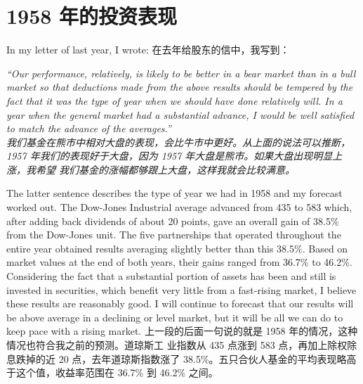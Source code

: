 \section{1958 年的投资表现}

\begin{verseparallel}
  {
    In my letter of last year, I wrote:
  }
  {
    在去年给股东的信中，我写到：\\
  }
\end{verseparallel}

\begin{verseparallel}
    { 
      \hspace{-0.9em}
      \textit{
      “Our performance, relatively, is likely to be better in a bear market
      than in a bull market so that deductions made from the above results
      should be tempered by the fact that it was the type of year when we should
      have done relatively will. In a year when the general market had a
      substantial advance, I would be well satisfied to match the advance of the
      averages.” \\
      }
    }
    {
      \hspace{-0.6em}
      \textit{
      我们基金在熊市中相对大盘的表现，会比牛市中更好。从上面的说法可以推断，1957
      年我们的表现好于大盘，因为 1957 年大盘是熊市。如果大盘出现明显上涨，我希望
      我们基金的涨幅都够跟上大盘，这样我就会比较满意。
      }
    }
\end{verseparallel}

\begin{verseparallel}
  {
    The latter sentence describes the type of year we had in 1958 and my
    forecast worked out. The Dow-Jones Industrial average advanced from 435 to
    583 which, after adding back dividends of about 20 points, gave an overall
    gain of 38.5\% from the Dow-Jones unit. The five partnerships that operated
    throughout the entire year obtained results averaging slightly better than
    this 38.5\%. Based on market values at the end of both years, their gains
    ranged from 36.7\% to 46.2\%. Considering the fact that a substantial
    portion of assets has been and still is invested in securities, which
    benefit very little from a fast-rising market, I believe these results are
    reasonably good. I will continue to forecast that our results will be above
    average in a declining or level market, but it will be all we can do to keep
    pace with a rising market.
  }
  {
    上一段的后面一句说的就是 1958 年的情况，这种情况也符合我之前的预测。道琼斯工
    业指数从 435 点涨到 583 点，再加上除权除息跌掉的近 20 点，去年道琼斯指数涨了
    38.5\%。五只合伙人基金的平均表现略高于这个值，收益率范围在 36.7\% 到 46.2\%
    之间。
  }
\end{verseparallel}
  
